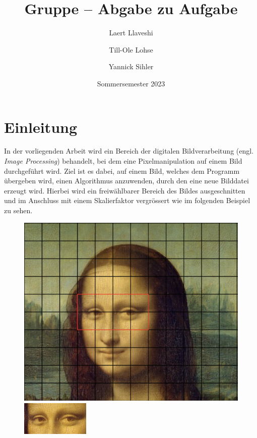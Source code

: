 \documentclass[course=erap]{aspdoc}
\author{Laert Llaveshi \and Till-Ole Lohse \and Yannick Sihler}
\date{Sommersemester 2023} %
\title{Gruppe \theGroup{} -- Abgabe zu Aufgabe \theNumber}
\begin{document}
\maketitle

\section{Einleitung}

In der vorliegenden Arbeit wird ein Bereich der digitalen Bildverarbeitung (engl. {\textit{Image Processing}}) behandelt, bei dem eine Pixelmanipulation auf einem Bild durchgeführt wird. Ziel ist es dabei, auf einem Bild, welches dem Programm übergeben wird, einen Algorithmus anzuwenden, durch den eine neue Bilddatei erzeugt wird. Hierbei wird ein freiwählbarer Bereich des Bildes ausgeschnitten und im Anschluss mit einem Skalierfaktor vergrössert wie im folgenden Beispiel zu sehen. 

\graphicspath{{images/}}

\begin{figure}[h]
    \centering
    \begin{minipage}[b]{0.4\textwidth}
        \centering
        \includegraphics[width=\textwidth]{Monalisa.png}
    \end{minipage}
    \hfill
    \begin{minipage}[b]{0.4\textwidth}
        \centering
        \includegraphics[width=\textwidth]{mona_lisa_eyes.png}
    \end{minipage}
\end{figure}
\end{document}
